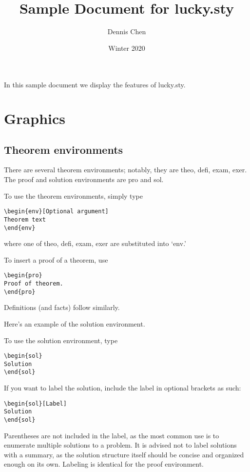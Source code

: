 \documentclass{article}
\title{Sample Document for lucky.sty}
\author{Dennis Chen}
\date{Winter 2020}
\begin{document}
\maketitle

In this sample document we display the features of lucky.sty.

\section{Graphics}

\subsection{Theorem environments}

There are several theorem environments; notably, they are theo, defi, exam, exer. The proof and solution environments are pro and sol.

\begin{theo}
To use the theorem environments, simply type
\begin{verbatim}
\begin{env}[Optional argument]
Theorem text
\end{env}
\end{verbatim}
where one of theo, defi, exam, exer are substituted into `env.'
\end{theo}

\begin{pro}
To insert a proof of a theorem, use
\begin{verbatim}
\begin{pro}
Proof of theorem.
\end{pro}
\end{verbatim}
\end{pro}

\begin{defi}[Definitions]
Definitions (and facts) follow similarly.
\end{defi}

\begin{exam}
Here's an example of the solution environment.
\end{exam}

\begin{sol}
To use the solution environment, type
\begin{verbatim}
\begin{sol}
Solution
\end{sol}
\end{verbatim}
If you want to label the solution, include the label in optional brackets as such:
\begin{verbatim}
\begin{sol}[Label]
Solution
\end{sol}
\end{verbatim}
Parentheses are not included in the label, as the most common use is to enumerate multiple solutions to a problem. It is advised not to label solutions with a summary, as the solution structure itself should be concise and organized enough on its own. Labeling is identical for the proof environment.
\end{sol}
\end{document}
